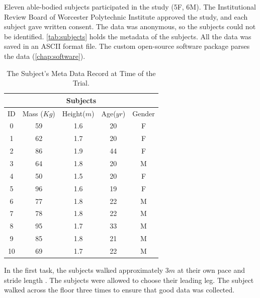 
Eleven able-bodied subjects participated in the study (5F, 6M). The Institutional Review Board of Worcester Polytechnic Institute approved the study, and each subject gave written consent. The data was anonymous, so the subjects could not be identified. \autoref{tab:subjects} holds the metadata of the subjects. All the data was saved in an ASCII format file. The custom open-source software package parses the data (\autoref{chap:software}).

\begin{table}[h!]
\centering
 \begin{tabular}{|c c c c c|} 
 \hline 
 \multicolumn{5}{|c|}{Subjects} \\
 \hline
 ID & Mass ($Kg$) &  Height($m$)  & Age($yr$)  & Gender \\ [0.5ex] 
 \hline\hline
 0 & 59 & 1.6 & 20 & F \\
 \hline
 1 & 62 & 1.7 & 20 & F \\ 
 \hline
 2 & 86 & 1.9 & 44 & F \\
 \hline
 3 & 64 & 1.8 & 20 & M \\ 
 \hline
 4 & 50 & 1.5 & 20 & F \\
 \hline
 5 & 96 & 1.6 &  19 & F\\
 \hline
 6 & 77 & 1.8 & 22 & M \\
 \hline
 7 & 78 & 1.8 & 22 & M \\
 \hline
 8 & 95 & 1.7 & 33 & M \\
 \hline
 9 & 85 & 1.8 & 21 & M \\
 \hline
 10 & 69 & 1.7 & 22 & M \\[1ex] 
 \hline
\end{tabular}
\caption[Subject Meta Data Table]{The Subject's Meta Data Record at Time of the Trial.}
\label{tab:subjects}
\end{table}



 In the first task, the subjects walked approximately 3$m$ at their own pace and stride length \cite{peters2014concurrent}. The subjects were allowed to choose their leading leg. The subject walked across the floor three times to ensure that good data was collected. 

